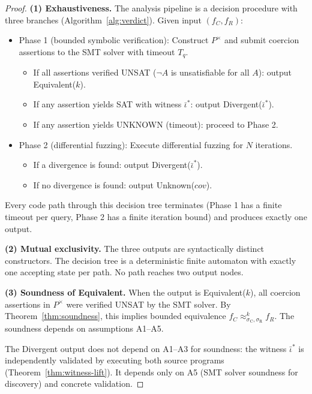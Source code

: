 \documentclass[11pt]{article}
\newcommand{\SemConfigC}{\sigma_{\mathrm{C}}}
\newcommand{\SemConfigR}{\sigma_{\mathrm{R}}}
\begin{document}
\begin{proof}
\textbf{(1) Exhaustiveness.} The analysis pipeline is a decision procedure with three branches (Algorithm~\ref{alg:verdict}). Given input $(f_C, f_R)$:
\begin{itemize}
  \item Phase 1 (bounded symbolic verification): Construct $P^\times$ and submit coercion assertions to the SMT solver with timeout $T_q$.
  \begin{itemize}
    \item If all assertions verified UNSAT ($\neg A$ is unsatisfiable for all $A$): output Equivalent($k$).
    \item If any assertion yields SAT with witness $\bar{\iota}^*$: output Divergent($\bar{\iota}^*$).
    \item If any assertion yields UNKNOWN (timeout): proceed to Phase 2.
  \end{itemize}
  \item Phase 2 (differential fuzzing): Execute differential fuzzing for $N$ iterations.
  \begin{itemize}
    \item If a divergence is found: output Divergent($\bar{\iota}^*$).
    \item If no divergence is found: output Unknown($\mathit{cov}$).
  \end{itemize}
\end{itemize}
Every code path through this decision tree terminates (Phase 1 has a finite timeout per query, Phase 2 has a finite iteration bound) and produces exactly one output.

\textbf{(2) Mutual exclusivity.} The three outputs are syntactically distinct constructors. The decision tree is a deterministic finite automaton with exactly one accepting state per path. No path reaches two output nodes.

\textbf{(3) Soundness of Equivalent.} When the output is Equivalent($k$), all coercion assertions in $P^\times$ were verified UNSAT by the SMT solver. By Theorem~\ref{thm:soundness}, this implies bounded equivalence $f_C \approx^k_{\SemConfigC, \SemConfigR} f_R$. The soundness depends on assumptions A1--A5.

The Divergent output does not depend on A1--A3 for soundness: the witness $\bar{\iota}^*$ is independently validated by executing both source programs (Theorem~\ref{thm:witness-lift}). It depends only on A5 (SMT solver soundness for discovery) and concrete validation.
\end{proof}
\end{document}
